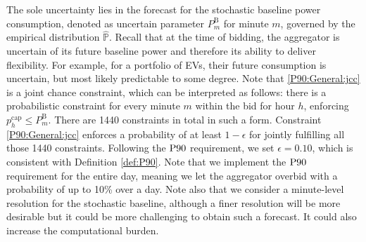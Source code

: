 \documentclass[conference]{IEEEtran}
\begin{document}
The sole uncertainty lies in the forecast for the stochastic baseline power consumption, denoted as uncertain parameter $P_{m}^{\text{B}}$ for minute $m$, governed by the empirical distribution $\hat{\mathbb{P}}$. Recall that at the time of bidding, the aggregator is uncertain of its future baseline power and therefore its ability to deliver flexibility. For example, for a portfolio of \acp{EV}, their future consumption is uncertain, but most likely predictable to some degree. Note that \eqref{P90:General:jcc} is a joint chance constraint, which can be interpreted as follows: there is a probabilistic constraint for every minute $m$ within the bid for hour $h$, enforcing $p_{h}^{\text{cap}} \leq P_{m}^{\text{B}}$. There are 1440 constraints in total in such a form. Constraint \eqref{P90:General:jcc} enforces a probability of at least $1-\epsilon$ for jointly fulfilling all those 1440 constraints. Following the $\rm{P90}$ requirement, we set $\epsilon\!=\!0.10$, which is consistent with Definition \ref{def:P90}. Note that we implement the $\rm{P90}$ requirement for the entire day, meaning we let the aggregator overbid with a probability of up to 10\% over a day. Note also that we consider a minute-level resolution for the stochastic baseline, although a finer resolution will be more desirable but it could be more challenging to obtain such a forecast. It could also increase the computational burden. 


\end{document}
